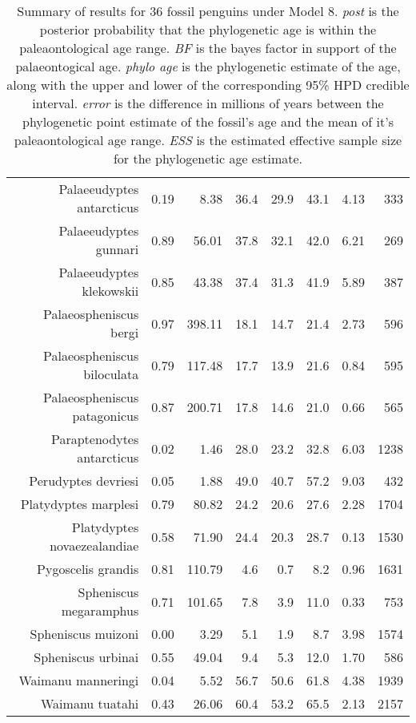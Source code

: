 \begin{table}[ht]
\begin{tabular}{rrrrrrrr}
  Palaeeudyptes antarcticus & 0.19 & 8.38 & 36.4 & 29.9 & 43.1 & 4.13 & 333 \\ 
  Palaeeudyptes gunnari & 0.89 & 56.01 & 37.8 & 32.1 & 42.0 & 6.21 & 269 \\ 
  Palaeeudyptes klekowskii & 0.85 & 43.38 & 37.4 & 31.3 & 41.9 & 5.89 & 387 \\ 
  Palaeospheniscus bergi & 0.97 & 398.11 & 18.1 & 14.7 & 21.4 & 2.73 & 596 \\ 
  Palaeospheniscus biloculata & 0.79 & 117.48 & 17.7 & 13.9 & 21.6 & 0.84 & 595 \\ 
  Palaeospheniscus patagonicus & 0.87 & 200.71 & 17.8 & 14.6 & 21.0 & 0.66 & 565 \\ 
  Paraptenodytes antarcticus & 0.02 & 1.46 & 28.0 & 23.2 & 32.8 & 6.03 & 1238 \\ 
  Perudyptes devriesi & 0.05 & 1.88 & 49.0 & 40.7 & 57.2 & 9.03 & 432 \\ 
  Platydyptes marplesi & 0.79 & 80.82 & 24.2 & 20.6 & 27.6 & 2.28 & 1704 \\ 
  Platydyptes novaezealandiae & 0.58 & 71.90 & 24.4 & 20.3 & 28.7 & 0.13 & 1530 \\ 
  Pygoscelis grandis & 0.81 & 110.79 & 4.6 & 0.7 & 8.2 & 0.96 & 1631 \\ 
  Spheniscus megaramphus & 0.71 & 101.65 & 7.8 & 3.9 & 11.0 & 0.33 & 753 \\ 
  Spheniscus muizoni & 0.00 & 3.29 & 5.1 & 1.9 & 8.7 & 3.98 & 1574 \\ 
  Spheniscus urbinai & 0.55 & 49.04 & 9.4 & 5.3 & 12.0 & 1.70 & 586 \\ 
  Waimanu manneringi & 0.04 & 5.52 & 56.7 & 50.6 & 61.8 & 4.38 & 1939 \\ 
  Waimanu tuatahi & 0.43 & 26.06 & 60.4 & 53.2 & 65.5 & 2.13 & 2157 \\ 
   \hline
\end{tabular}
\caption{Summary of results for 36 fossil penguins under Model 8. {\em post} is the posterior probability that the phylogenetic age is within the paleaontological age range. {\em BF} is the bayes factor in support of the palaeontogical age. {\em phylo age} is the phylogenetic estimate of the age, along with the upper and lower of the corresponding 95\% HPD credible interval. {\em error} is the difference in millions of years between the phylogenetic point estimate of the fossil's age and the mean of it's paleaontological age range. {\em ESS} is the estimated effective sample size for the phylogenetic age estimate.} 
\label{fossilTable8}
\end{table}
